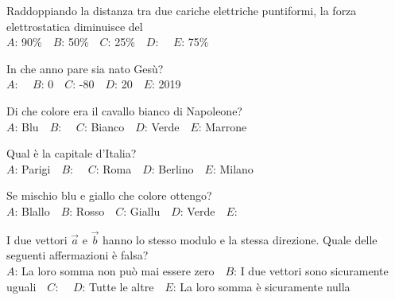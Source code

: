 \mcquestionfooter



\def\mcquestionnumber{5}


\mcquestionheader Raddoppiando la distanza tra due cariche elettriche puntiformi, la forza elettrostatica diminuisce del\\
{$A$}: 90\%\ \ {$B$}: 50\%\ \ {$C$}: 25\%\ \ {$D$}: \ \ {$E$}: 75\%\ \ 

\mcquestionfooter



\def\mcquestionnumber{6}


\mcquestionheader In che anno pare sia nato Gesù?\\
{$A$}: \ \ {$B$}: 0\ \ {$C$}: -80\ \ {$D$}: 20\ \ {$E$}: 2019\ \ 

\mcquestionfooter



\def\mcquestionnumber{7}


\mcquestionheader Di che colore era il cavallo bianco di Napoleone?\\
{$A$}: Blu\ \ {$B$}: \ \ {$C$}: Bianco\ \ {$D$}: Verde\ \ {$E$}: Marrone\ \ 

\mcquestionfooter



\def\mcquestionnumber{8}


\mcquestionheader Qual è la capitale d’Italia?\\
{$A$}: Parigi\ \ {$B$}: \ \ {$C$}: Roma\ \ {$D$}: Berlino\ \ {$E$}: Milano\ \ 

\mcquestionfooter



\def\mcquestionnumber{9}


\mcquestionheader Se mischio blu e giallo che colore ottengo?\\
{$A$}: Blallo\ \ {$B$}: Rosso\ \ {$C$}: Giallu\ \ {$D$}: Verde\ \ {$E$}: \ \ 

\mcquestionfooter



\def\mcquestionnumber{10}


\mcquestionheader I due vettori $\vec{a}$ e $\vec{b}$ hanno lo stesso modulo e la stessa direzione. Quale delle seguenti affermazioni è falsa?\\
{$A$}: La loro somma non può mai essere zero\ \ {$B$}: I due vettori sono sicuramente uguali\ \ {$C$}: \ \ {$D$}: Tutte le altre\ \ {$E$}: La loro somma è sicuramente nulla\ \ 

\mcquestionfooter



